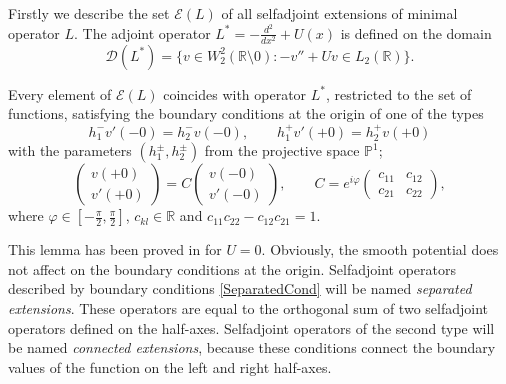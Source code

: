 \documentclass[11pt,english]{amsart}%
\begin{document}
Firstly we describe the set  $\mathcal{E}(L)$ of all selfadjoint extensions of  minimal operator $L$. The adjoint operator $L^*=-\frac{d^2}{dx^2}+U(x)$ is defined on the domain
$$
\mathcal{D}(L^*)=\{v\in W_2^2(\mathbb{R}\setminus 0)\colon -v''+Uv\in L_2(\mathbb{R})\}.
$$
\begin{g_lemma}\label{AllExtensionsLemma}
Every element of  $\mathcal{E}(L)$ coincides with operator $L^*$, restricted to the set of functions, satisfying the boundary conditions at the origin of one of the types
\begin{equation}\label{SeparatedCond}
      h_1^- v'(-0)=h_2^- v(-0),\qquad
      h_1^+ v'(+0)=h_2^+ v(+0)
\end{equation}
with the parameters $(h_1^\pm, h_2^\pm)$ from the projective space $\mathbb{P}^1$;
\begin{equation}\label{ConnectedCond}
\begin{pmatrix} v(+0) \\ v'(+0) \end{pmatrix}
=C\begin{pmatrix} v(-0) \\ v'(-0) \end{pmatrix},\qquad
C=e^{i\varphi}\begin{pmatrix} c_{11} & c_{12} \\ c_{21} & c_{22} \end{pmatrix},
\end{equation}
where $\varphi\in
[-\frac{\pi}{2},\frac{\pi}{2}]$, $c_{kl}\in\mathbb{R}$ and $c_{11}c_{22}-c_{12}c_{21}=1$.
\end{g_lemma}
This lemma has been proved in \cite{ChernoffHughesJFunctAnal93, SebaCzechJPhys86} for $U=0$.
Obviously, the smooth potential does not affect on the boundary conditions at the origin.
Selfadjoint operators described by  boundary conditions \eqref{SeparatedCond} will be named
\textit{separated extensions}. These operators are equal to the orthogonal sum of
two selfadjoint operators defined on the half-axes.
Selfadjoint ope\-ra\-tors of the second type will be named  \textit{connected extensions},
because these conditions connect the boundary values of the function on
the left and right half-axes.
\end{document}
